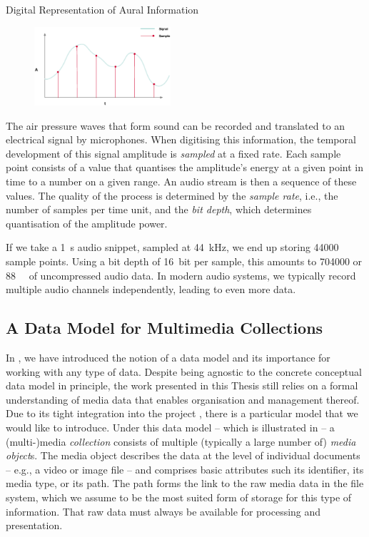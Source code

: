\begin{example}[label=example:representation_audio_information]{Digital Representation of Aural Information}{}
    \begin{figure}
        \includegraphics[width=0.45\textwidth]{figures/example-audio-signal.eps}
    \end{figure}
    The air pressure waves that form sound can be recorded and translated to an electrical signal by microphones. When digitising this information, the temporal development of this signal amplitude is \emph{sampled} at a fixed rate. Each sample point consists of a value that quantises the amplitude's energy at a given point in time to a number on a given range. An audio stream is then a sequence of these values. The quality of the process is determined by the \emph{sample rate}, i.e., the number of samples per time unit, and the \emph{bit depth}, which determines quantisation of the amplitude power.

    If we take a \SI{1}{\second} audio snippet, sampled at \SI{44}{\kilo\hertz}, we end up storing \num{44000} sample points. Using a bit depth of \SI{16}{bit} per sample, this amounts to \SI{704000}{\bit} or \SI{88}{\kilo\byte} of uncompressed audio data. In modern audio systems, we typically record multiple audio channels independently, leading to even more data.
\end{example}

\subsection{A Data Model for Multimedia Collections}
\label{section:media_data_model}
In , we have introduced the notion of a data model and its importance for working with any type of data. Despite being agnostic to the concrete conceptual data model in principle, the work presented in this Thesis still relies on a formal understanding of media data that enables organisation and management thereof. Due to its tight integration into the \vitrivr{} project \cite{Rossetto:2016Vitrivr,Gasser:2019Multimodal,Heller:2020Multi}, there is a particular model that we would like to introduce. Under this data model -- which is illustrated in  -- a (multi-)media \emph{collection} consists of multiple (typically a large number of) \emph{media object}s. The media object describes the data at the level of individual documents -- e.g., a video or image file -- and comprises basic attributes such its identifier, its media type, or its path. The path forms the link to the raw media data in the file system, which we assume to be the most suited form of storage for this type of information. That raw data must always be available for processing and presentation.

